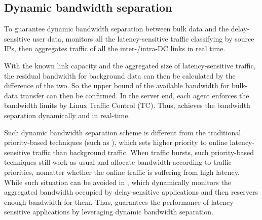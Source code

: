 %
%
%
%

\subsection{Dynamic bandwidth separation}
\label{subsec:system:separation}

To guarantee dynamic bandwidth separation between bulk data and the delay-sensitive user data, \name monitors all the latency-sensitive traffic classifying by source IPs, then aggregates traffic of all the inter-/intra-DC links in real time.

With the known link capacity and the aggregated size of latency-sensitive traffic, the residual bandwidth for background data can then be calculated by the difference of the two. So the upper bound of the available bandwidth for bulk-data transfer can then be confirmed. In the server end, each agent enforces the bandwidth limits by Linux Traffic Control (TC). Thus, \name achieves the bandwidth separation dynamically and in real-time.

Such dynamic bandwidth separation scheme is different from the traditional priority-based techniques (such as \cite{kumar2015bwe}), which sets higher priority to online latency-sensitive traffic than background traffic. When traffic bursts, such priority-based techniques still work as usual and allocate bandwidth according to traffic priorities, nomatter whether the online traffic is suffering from high latency. While such situation can be avoided in \name, which dynamically monitors the aggregated bandwidth occupied by delay-sensitive applications and then reservers enough bandwidth for them. Thus, \name guarantees the performance of latency-sensitive applications by leveraging dynamic bandwidth separation.


